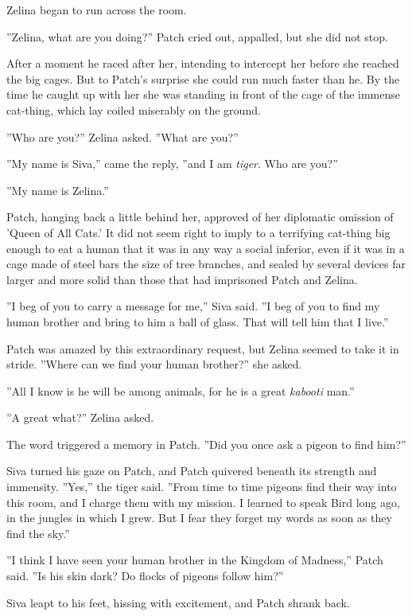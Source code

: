 \documentclass[12pt]{book}
\begin{document}
 Zelina began to run across the room.\par
 ''Zelina, what are you doing?'' Patch cried out, appalled, but she did not stop.\par
After a moment he raced after her, intending to intercept her before she reached the big cages. But to Patch's surprise she could run much faster than he. By the time he caught up with her she was standing in front of the cage of the immense cat-thing, which lay coiled miserably on the ground.\par
 ''Who are you?'' Zelina asked. ''What are you?''\par
 ''My name is Siva,'' came the reply, ''and I am {\it tiger}. Who are you?''\par
 ''My name is Zelina.''\par
Patch, hanging back a little behind her, approved of her diplomatic omission of 'Queen of All Cats.' It did not seem right to imply to a terrifying cat-thing big enough to eat a human that it was in any way a social inferior, even if it was in a cage made of steel bars the size of tree branches, and sealed by several devices far larger and more solid than those that had imprisoned Patch and Zelina.\par
''I beg of you to carry a message for me,'' Siva said. ''I beg of you to find my human brother and bring to him a ball of glass. That will tell him that I live.''\par
Patch was amazed by this extraordinary request, but Zelina seemed to take it in stride. ''Where can we find your human brother?'' she asked.\par
''All I know is he will be among animals, for he is a great {\it kabooti} man.''\par
''A great what?'' Zelina asked.\par
The word triggered a memory in Patch. ''Did you once ask a pigeon to find him?''\par
Siva turned his gaze on Patch, and Patch quivered beneath its strength and immensity. ''Yes,'' the tiger said. ''From time to time pigeons find their way into this room, and I charge them with my mission. I learned to speak Bird long ago, in the jungles in which I grew. But I fear they forget my words as soon as they find the sky.''\par
''I think I have seen your human brother in the Kingdom of Madness,'' Patch said. ''Is his skin dark? Do flocks of pigeons follow him?''\par
Siva leapt to his feet, hissing with excitement, and Patch shrank back.\par
\end{document}
